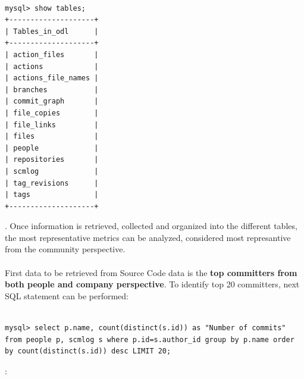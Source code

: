 \documentclass[a4paper, 12pt]{book}
\begin{document}
\begin{verbatim}

mysql> show tables;
+--------------------+
| Tables_in_odl      |
+--------------------+
| action_files       |
| actions            |
| actions_file_names |
| branches           |
| commit_graph       |
| file_copies        |
| file_links         |
| files              |
| people             |
| repositories       |
| scmlog             |
| tag_revisions      |
| tags               |
+--------------------+

\end{verbatim}
. Once information is retrieved, collected and organized into the different tables, the most representative metrics can be analyzed, considered most represantive from the community perspective.\\
\\
First data to be retrieved from Source Code data is the \textbf{top committers from both people and company perspective}. To identify top 20 committers, next SQL statement can be performed:
\begin{verbatim}

mysql> select p.name, count(distinct(s.id)) as "Number of commits"
from people p, scmlog s where p.id=s.author_id group by p.name order
by count(distinct(s.id)) desc LIMIT 20;

\end{verbatim}
:
\end{document}

